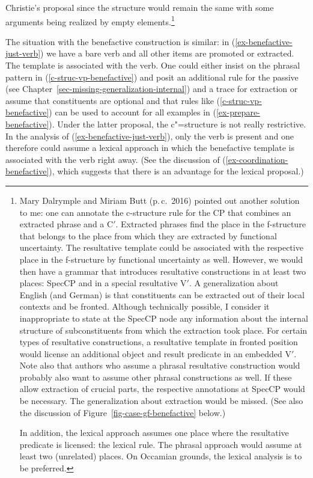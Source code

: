 Christie's proposal since the structure would remain the same with some arguments being realized by empty elements.\footnote{%
    Mary Dalrymple and Miriam Butt (p.\,c.\ 2016) pointed out another solution to me: one can annotate the c-structure
    rule for the CP that combines an extracted phrase and a C$'$. Extracted phrases find the place in
    the f-structure that belongs to the place from which they are extracted by functional
    uncertainty. The resultative template could be associated with the respective place in the
    f-structure by functional uncertainty as well. However, we would then have a grammar that introduces
    resultative constructions in at least two places: SpecCP and in a special resultative V$'$. A
    generalization about English (and German) is that constituents can be extracted out of their local
    contexts and be fronted. Although technically possible, I consider it inappropriate to state at the
    SpecCP node any information about the internal structure of subconstituents from which the
    extraction took place. For certain types of resultative constructions, a resultative template in fronted position would license an additional
    object and result predicate in an embedded V$'$. Note also that authors who assume a phrasal
    resultative construction would probably also want to assume other phrasal constructions as well. If these allow extraction of crucial
    parts, the respective annotations at SpecCP would be necessary. The generalization about extraction
    would be missed. (See also the discussion of Figure~\ref{fig-case-gf-benefactive} below.)

    In addition, the lexical approach assumes one place where the resultative predicate is licensed: the
    lexical rule. The phrasal approach would assume at least two (unrelated) places. On Occamian grounds,
    the lexical analysis is to be preferred. 
}

\largerpage[2]
The situation with the benefactive construction is similar: in (\ref{ex-benefactive-just-verb}) we
have a bare verb and all other items are promoted or extracted. The template is associated with the
verb. One could either insist on the phrasal pattern in (\ref{c-struc-vp-benefactive}) and posit an
additional rule for the passive (see Chapter~\ref{sec-missing-generalization-internal}) and a trace
for extraction or assume that constituents are optional and that rules like
(\ref{c-struc-vp-benefactive}) can be used to account for all examples in
(\ref{ex-prepare-benefactive}). Under the latter proposal, the c"=structure is not really
restrictive. In the analysis of (\ref{ex-benefactive-just-verb}), only the verb is present and
one therefore could assume a lexical approach in which the benefactive template is associated with
the verb right away. (See the discussion of (\ref{ex-coordination-benefactive}), which suggests that there is an advantage for
the lexical proposal.)

